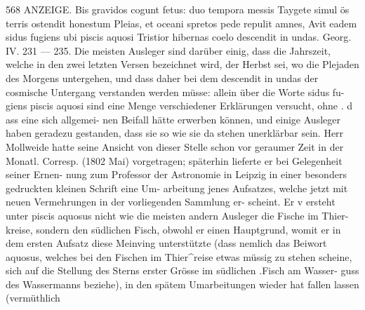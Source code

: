 \documentclass[12pt,a4paper]{article}
\begin{document}
\newpage
568 ANZEIGE.\newline
Bis gravidos cogunt fetus: duo tempora messis\newline
Taygete simul ös terris ostendit honestum\newline
Pleias, et oceani spretos pede repulit amnes,\newline
Avit eadem sidus fugiens ubi piscis aquosi\newline
Tristior hibernas coelo descendit in undas.\newline
Georg. IV. 231 --- 235.\newline
Die meisten Ausleger sind darüber einig, dass die Jahrszeit, welche in den zwei letzten Versen\newline
bezeichnet wird, der Herbst sei, wo die Plejaden des Morgens untergehen, und dass daher bei dem\newline
descendit in undas der cosmische Untergang verstanden werden müsse: allein über die Worte sidus fu-\newline
giens piscis aquosi sind eine Menge verschiedener Erklärungen versucht, ohne . d ass eine sich allgemei-\newline
nen Beifall hätte erwerben können, und einige Ausleger haben geradezu gestanden, dass sie so wie sie\newline
da stehen unerklärbar sein. Herr Mollweide hatte seine Ansicht von dieser Stelle schon vor geraumer\newline
Zeit in der Monatl. Corresp. (1802 Mai) vorgetragen; späterhin lieferte er bei Gelegenheit seiner Ernen-\newline
nung zum Professor der Astronomie in Leipzig in einer besonders gedruckten kleinen Schrift eine Um-\newline
arbeitung jenes Aufsatzes, welche jetzt mit neuen Vermehrungen in der vorliegenden Sammlung er-\newline
scheint. Er v ersteht unter piscis aquosus nicht wie die meisten andern Ausleger die Fische im Thier-\newline
kreise, sondern den südlichen Fisch, obwohl er einen Hauptgrund, womit er in dem ersten Aufsatz diese\newline
Meinving unterstützte (dass nemlich das Beiwort aquosus, welches bei den Fischen im Thier\^{}reise etwas\newline
müssig zu stehen scheine, sich auf die Stellung des Sterns erster Grösse im südlichen .Fisch am Wasser-\newline
guss des Wassermanns beziehe), in den spätem Umarbeitungen wieder hat fallen lassen (vermüthlich\newline
\end{document}
